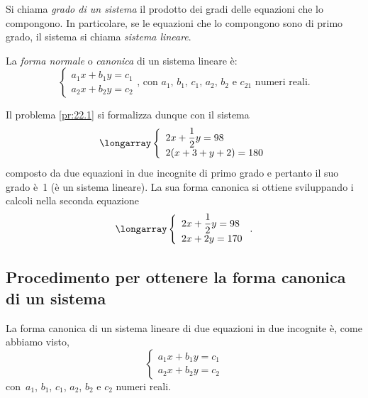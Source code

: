 \begin{definizione}
Si chiama \emph{grado di un sistema} il prodotto dei gradi delle
equazioni che lo compongono. In particolare, se le equazioni che lo
compongono sono di primo grado, il sistema si chiama \emph{sistema lineare}.

La \emph{forma normale} o \emph{canonica} di un sistema lineare è:
\[\left\{\begin{array}{l}a_{1}x+b_{1}y=c_{1}\\
a_{2}x+b_{2}y=c_{2} \end{array}\right.\text{, con }a_{1}\text{,~}b_{1}\text{,~}c_{1}\text{,~}a_{2}\text{,~}b_{2}\text{ e }c_{21}\text{ numeri reali.}\]
\end{definizione}

Il problema \ref{pr:22.1} si formalizza dunque con il sistema
\[\longarray\left\{\begin{array}{l}2x+\dfrac{1}{2}y=98
\\2(x+3+y+2)=180\end{array}\right.\]
composto da due equazioni in due incognite di primo grado e pertanto il suo grado
è~1 (è un sistema lineare). La sua forma canonica si ottiene
sviluppando i calcoli nella seconda equazione
\[\longarray\left\{\begin{array}{l}2x+\dfrac{1}{2}y=98\\
2x+2y=170 \end{array}\right..\]

\subsection{Procedimento per ottenere la forma canonica di un sistema}
La forma canonica di un sistema lineare di due equazioni in due
incognite è, come abbiamo visto,
\[\left\{\begin{array}{l}a_{1}x+b_{1}y=c_{1}
\\a_{2}x+b_{2}y=c_{2} \end{array}\right.\]
con~$a_{1}$, $b_{1}$, $c_{1}$, $a_{2}$, $b_{2}$ e $c_{2}$ numeri reali.

